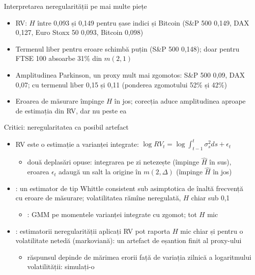 \begin{frame}{Interpretarea neregularității pe mai multe piețe}
\itemsize{\small}
\begin{itemize}
    \item RV: $H$ între 0{,}093 și 0{,}149 pentru șase indici și Bitcoin (S\&P 500 0{,}149, DAX 0{,}127, Euro Stoxx 50 0{,}093, Bitcoin 0{,}098)
    \item Termenul liber pentru eroare schimbă puțin (S\&P 500 0{,}148); doar pentru FTSE 100 absoarbe 31\% din $m(2, 1)$
    \item Amplitudinea Parkinson, un proxy mult mai zgomotos: S\&P 500 0{,}09, DAX 0{,}07; cu termenul liber 0{,}15 și 0{,}11 (ponderea zgomotului 52\% și 42\%)
    \item Eroarea de măsurare împinge $H$ în jos; corecția aduce amplitudinea aproape de estimația din RV, dar nu peste ea
\end{itemize}
\end{frame}

\begin{frame}{Critici: neregularitatea ca posibil artefact}
\itemsize{\small}
\begin{itemize}
    \item RV este o estimație a varianței integrate: $\log RV_t = \log\int_{t-1}^t\sigma_s^2ds + \epsilon_t$
    \begin{itemize}
        \item două deplasări opuse: integrarea pe zi netezește (împinge $\hat H$ în sus), eroarea $\epsilon_t$ adaugă un salt la origine în $m(2, \Delta)$ (împinge $\hat H$ în jos)
    \end{itemize}
    \item {}: un estimator de tip Whittle consistent sub asimptotica de înaltă frecvență cu eroare de măsurare; volatilitatea rămîne neregulată, $H$ chiar sub 0,1
    \begin{itemize}
        \item {}: GMM pe momentele varianței integrate cu zgomot; tot $H$ mic
    \end{itemize}
    \item {}: estimatorii neregularității aplicați RV pot raporta $H$ mic chiar și pentru o volatilitate netedă (markoviană): un artefact de eșantion finit al proxy-ului
    \begin{itemize}
        \item răspunsul depinde de mărimea erorii față de variația zilnică a logaritmului volatilității: simulați-o
    \end{itemize}
\end{itemize}
\end{frame}

